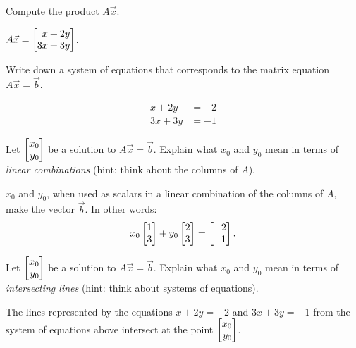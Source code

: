 	\begin{parts}
		\item Compute the product $A\vec x$.
			\begin{solution}
				$A \vec x = \mat{x+2y\\3x+3y}$.
			\end{solution}
		\item Write down a system of equations that corresponds to the matrix equation
			$A\vec x=\vec b$.
			\begin{solution}
				\begin{align*}
					x + 2y &= -2 \\
					3x + 3y &= -1
				\end{align*}
			\end{solution}
		\item Let $\mat{x_0\\y_0}$ be a solution to $A\vec x=\vec b$. Explain what
			$x_0$ and $y_0$ mean in terms of \emph{linear combinations} (hint: think
			about the columns of $A$).
			\begin{solution}
				$x_0$ and $y_0$, when used as scalars in a linear combination of
				the columns of $A$, make the vector $\vec b$. In other words:
				\[
					x_0 \mat{1\\3} + y_0 \mat{2\\3} = \mat{-2\\-1}.
				\]
			\end{solution}
		\item Let $\mat{x_0\\y_0}$ be a solution to $A\vec x=\vec b$. Explain what
			$x_0$ and $y_0$ mean in terms of \emph{intersecting lines} (hint: think
			about systems of equations).
			\begin{solution}
				The lines represented by the equations $x+2y=-2$ and $3x+3y=-1$
				from the system of equations above intersect at the point $\mat{x_0\\y_0}$.
			\end{solution}
	\end{parts}


